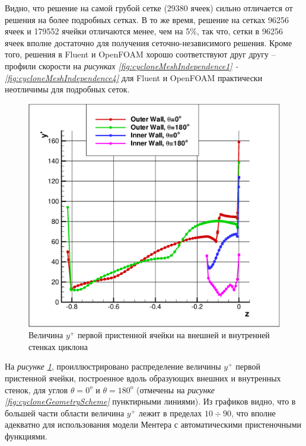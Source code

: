 \clearpage
Видно, что решение на самой грубой сетке (29380 ячеек) сильно отличается от решения на более подробных сетках. В то же время, решение на сетках 96256 ячеек и 179552 ячейки отличаются менее, чем на 5\%, так что, сетки в 96256 ячеек вполне достаточно для получения сеточно-независимого решения. Кроме того, решения в Fluent и OpenFOAM хорошо соответствуют друг другу -- профили скорости на \textit{рисунках \ref{fig:cycloneMeshIndependence1} -  \ref{fig:cycloneMeshIndependence4}} для Fluent и OpenFOAM практически неотличимы для подробных сеток.

\begin{figure}[h]
	\centering
	\includegraphics[scale=0.4]{yplusCyclone}
	\caption{Величина $y^{+}$ первой пристенной ячейки на внешней и внутренней стенках циклона}
	\label{fig:cycloneyPlus}
\end{figure}

На \textit{рисунке \ref{fig:cycloneyPlus}}, проиллюстрировано распределение величины $y^{+}$ первой пристенной ячейки, построенное вдоль образующих внешних и внутренных стенок, для углов $\theta=0^o$ и $\theta=180^o$ (отмечены на \textit{рисунке \ref{fig:cycloneGeometryScheme}} пунктирными линиями). Из графиков видно, что в большей части области величина $y^{+}$ лежит в пределах $10 \div 90$, что вполне адекватно для использования модели Ментера с автоматическими пристеночными функциями.

